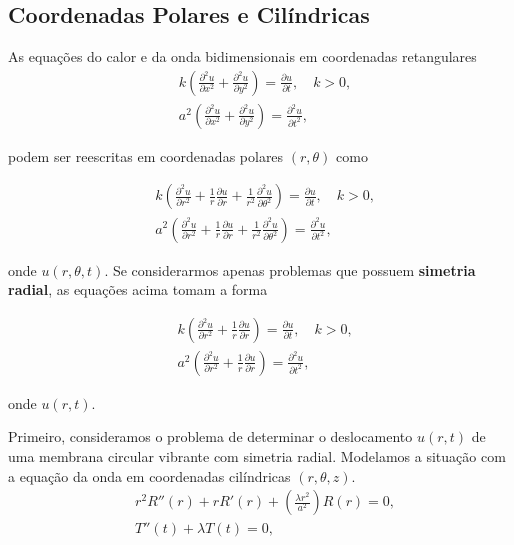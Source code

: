 \documentclass{article}
\begin{document}
\subsection{Coordenadas Polares e Cilíndricas}

As equações do calor e da onda bidimensionais em coordenadas retangulares
\begin{align}
    &k\left(\frac{\partial^2 u}{\partial x^2} + \frac{\partial^2 u}{\partial y^2}\right) = \frac{\partial u}{\partial t}, \quad k>0, \\
    &a^2\left(\frac{\partial^2 u}{\partial x^2} + \frac{\partial^2 u}{\partial y^2}\right) = \frac{\partial^2 u}{\partial t^2},
\end{align}

\noindent podem ser reescritas em coordenadas polares \((r, \theta)\) como

\begin{align}
    &k\left(\frac{\partial^2 u}{\partial r^2} + \frac{1}{r} \frac{\partial u}{\partial r} + \frac{1}{r^2} \frac{\partial^2 u}{\partial \theta^2}\right) = \frac{\partial u}{\partial t}, \quad k>0, \\
    &a^2\left(\frac{\partial^2 u}{\partial r^2} + \frac{1}{r} \frac{\partial u}{\partial r} + \frac{1}{r^2} \frac{\partial^2 u}{\partial \theta^2}\right) = \frac{\partial^2 u}{\partial t^2},
\end{align}

\noindent onde \(u(r, \theta, t)\). Se considerarmos apenas problemas que possuem \textbf{simetria radial}, as equações acima tomam a forma

\begin{align}
    &k\left(\frac{\partial^2 u}{\partial r^2} + \frac{1}{r} \frac{\partial u}{\partial r}\right) = \frac{\partial u}{\partial t}, \quad k>0, \\
    &a^2\left(\frac{\partial^2 u}{\partial r^2} + \frac{1}{r} \frac{\partial u}{\partial r}\right) = \frac{\partial^2 u}{\partial t^2},
\end{align}

\noindent onde \(u(r,t)\).

Primeiro, consideramos o problema de determinar o deslocamento \(u(r,t)\) de uma membrana circular vibrante com simetria radial. Modelamos a situação com a equação da onda em coordenadas cilíndricas \((r, \theta, z)\).
    \begin{align}
        &r^2 R''(r) + r R'(r) + \left(\frac{\lambda r^2}{a^2}\right) R(r) = 0, \\
        &T''(t) + \lambda T(t) = 0,
    \end{align}
\end{document}
